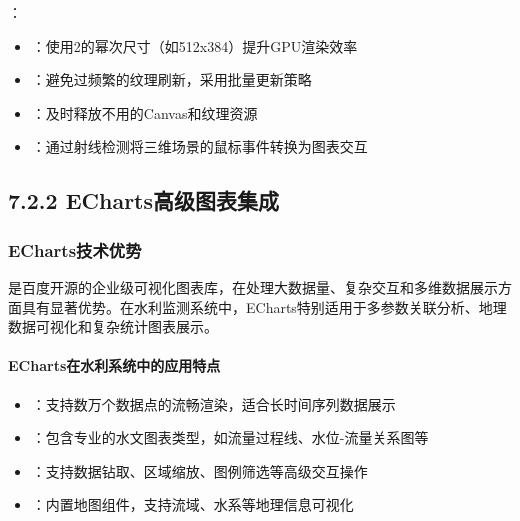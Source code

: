 ：

\begin{itemize}
\tightlist
\item
  ：使用2的幂次尺寸（如512x384）提升GPU渲染效率
\item
  ：避免过频繁的纹理刷新，采用批量更新策略
\item
  ：及时释放不用的Canvas和纹理资源
\item
  ：通过射线检测将三维场景的鼠标事件转换为图表交互
\end{itemize}

\hypertarget{echartsux9ad8ux7ea7ux56feux8868ux96c6ux6210}{%
\subsection{7.2.2 ECharts高级图表集成}\label{echartsux9ad8ux7ea7ux56feux8868ux96c6ux6210}}

\hypertarget{echartsux6280ux672fux4f18ux52bf}{%
\subsubsection{ECharts技术优势}\label{echartsux6280ux672fux4f18ux52bf}}

是百度开源的企业级可视化图表库，在处理大数据量、复杂交互和多维数据展示方面具有显著优势。在水利监测系统中，ECharts特别适用于多参数关联分析、地理数据可视化和复杂统计图表展示。

\hypertarget{echartsux5728ux6c34ux5229ux7cfbux7edfux4e2dux7684ux5e94ux7528ux7279ux70b9}{%
\paragraph{ECharts在水利系统中的应用特点}\label{echartsux5728ux6c34ux5229ux7cfbux7edfux4e2dux7684ux5e94ux7528ux7279ux70b9}}

\begin{itemize}
\tightlist
\item
  ：支持数万个数据点的流畅渲染，适合长时间序列数据展示
\item
  ：包含专业的水文图表类型，如流量过程线、水位-流量关系图等
\item
  ：支持数据钻取、区域缩放、图例筛选等高级交互操作
\item
  ：内置地图组件，支持流域、水系等地理信息可视化
\end{itemize}

